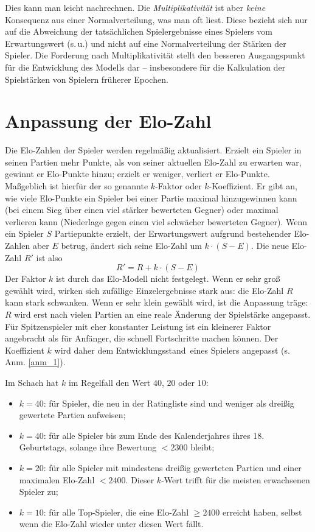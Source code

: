 Dies kann man leicht nachrechnen. Die \textit{Multiplikativität} ist aber \textit{keine} Konsequenz aus einer Normalverteilung, was man oft liest. Diese bezieht sich nur auf die Abweichung der tatsächlichen Spielergebnisse eines Spielers vom Erwartungswert (s.\,u.) und nicht auf eine Normalverteilung der Stärken der Spieler. Die Forderung nach Multiplikativität stellt den besseren Ausgangspunkt für die Entwicklung des Modells dar -- insbesondere für die Kalkulation der Spielstärken von Spielern früherer Epochen.


\section{Anpassung der Elo-Zahl}

Die Elo-Zahlen der Spieler werden regelmäßig aktualisiert. Erzielt ein Spieler in seinen Partien mehr Punkte, als von seiner aktuellen Elo-Zahl zu erwarten war, gewinnt er Elo-Punkte hinzu; erzielt er weniger, verliert er Elo-Punkte. Maßgeblich ist hierfür der so genannte $k$-Faktor oder $k$-Koeffizient. Er gibt an, wie viele Elo-Punkte ein Spieler bei einer Partie maximal hinzugewinnen kann (bei einem Sieg über einen viel stärker bewerteten Gegner) oder maximal verlieren kann (Niederlage gegen einen viel schwächer bewerteten Gegner). Wenn ein Spieler $S$ Partiepunkte erzielt, der Erwartungswert aufgrund bestehender Elo-Zahlen aber $E$ betrug, ändert sich seine Elo-Zahl um $k \cdot (S - E)$. Die neue Elo-Zahl $R'$ ist also
\[
    R' = R + k \cdot (S - E)
\]
Der Faktor $k$ ist durch das Elo-Modell nicht festgelegt. Wenn er sehr groß gewählt wird, wirken sich zufällige Einzelergebnisse stark aus: die Elo-Zahl $R$ kann stark schwanken. Wenn er sehr klein gewählt wird, ist die Anpassung \glqq träge\grqq : $R$ wird erst nach vielen Partien an eine reale Änderung der Spielstärke angepasst. Für Spitzenspieler mit eher konstanter Leistung ist ein kleinerer Faktor angebracht als für Anfänger, die schnell Fortschritte machen können. Der Koeffizient $k$ wird daher dem \glqq Entwicklungsstand\grqq\ eines Spielers angepasst (s. Anm. \ref{anm_1}).

Im Schach hat $k$ im Regelfall den Wert $40$, $20$ oder $10$:
\begin{itemize}
    \item $k = 40$: für Spieler, die neu in der Ratingliste sind und weniger als dreißig gewertete Partien aufweisen;
    \item $k = 40$: für alle Spieler bis zum Ende des Kalenderjahres ihres 18. Geburtstags, solange ihre Bewertung $< 2300$ bleibt;
    \item $k = 20$: für alle Spieler mit mindestens dreißig gewerteten Partien und einer maximalen Elo-Zahl $< 2400$. Dieser $k$-Wert trifft für die meisten erwachsenen Spieler zu;
    \item $k = 10$: für alle Top-Spieler, die eine Elo-Zahl $\geq 2400$ erreicht haben, selbst wenn die Elo-Zahl wieder unter diesen Wert fällt.
\end{itemize}

